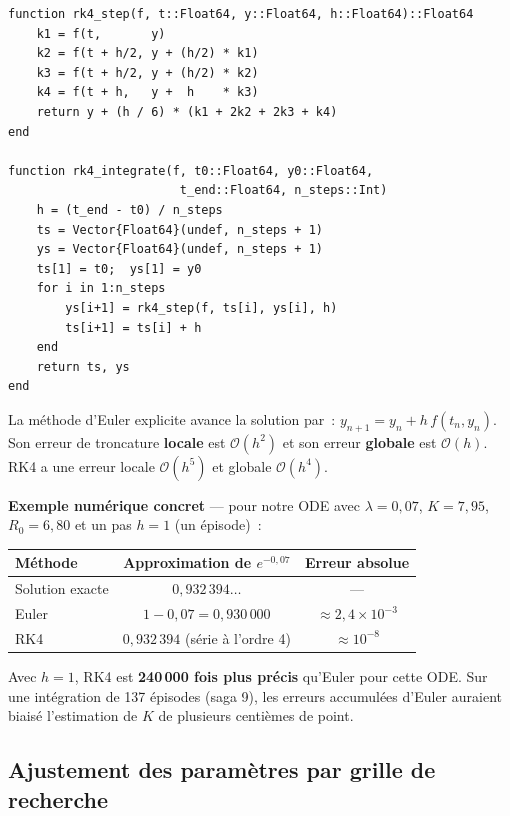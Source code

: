 \documentclass[a4paper,12pt,french]{article}
\newcommand{\code}[1]{\texttt{#1}}
\begin{document}
\begin{lstlisting}[caption={Implémentation de RK4 (extrait de \code{03\_ode\_rk4.jl})}]
function rk4_step(f, t::Float64, y::Float64, h::Float64)::Float64
    k1 = f(t,       y)
    k2 = f(t + h/2, y + (h/2) * k1)
    k3 = f(t + h/2, y + (h/2) * k2)
    k4 = f(t + h,   y +  h    * k3)
    return y + (h / 6) * (k1 + 2k2 + 2k3 + k4)
end

function rk4_integrate(f, t0::Float64, y0::Float64,
                        t_end::Float64, n_steps::Int)
    h = (t_end - t0) / n_steps
    ts = Vector{Float64}(undef, n_steps + 1)
    ys = Vector{Float64}(undef, n_steps + 1)
    ts[1] = t0;  ys[1] = y0
    for i in 1:n_steps
        ys[i+1] = rk4_step(f, ts[i], ys[i], h)
        ts[i+1] = ts[i] + h
    end
    return ts, ys
end
\end{lstlisting}

\begin{tcolorbox}[justif, title={Pourquoi RK4 et non la méthode d'Euler~?}]
La méthode d'Euler explicite avance la solution par~:
$y_{n+1} = y_n + h\,f(t_n, y_n)$.
Son erreur de troncature \textbf{locale} est $\mathcal{O}(h^2)$ et son erreur
\textbf{globale} est $\mathcal{O}(h)$.
RK4 a une erreur locale $\mathcal{O}(h^5)$ et globale $\mathcal{O}(h^4)$.

\medskip
\noindent\textbf{Exemple numérique concret} — pour notre ODE avec $\lambda = 0{,}07$,
$K = 7{,}95$, $R_0 = 6{,}80$ et un pas $h = 1$ (un épisode)~:
\begin{center}
\begin{tabular}{lcc}
\toprule
Méthode & Approximation de $e^{-0{,}07}$ & Erreur absolue \\
\midrule
Solution exacte & $0{,}932\,394\ldots$ & — \\
Euler           & $1 - 0{,}07 = 0{,}930\,000$ & $\approx 2{,}4 \times 10^{-3}$ \\
RK4             & $0{,}932\,394$ (série à l'ordre 4) & $\approx 10^{-8}$ \\
\bottomrule
\end{tabular}
\end{center}
Avec $h=1$, RK4 est \textbf{240\,000 fois plus précis} qu'Euler pour cette ODE.
Sur une intégration de 137 épisodes (saga 9), les erreurs accumulées d'Euler
auraient biaisé l'estimation de $K$ de plusieurs centièmes de point.
\end{tcolorbox}

\subsection{Ajustement des paramètres par grille de recherche}
\end{document}

